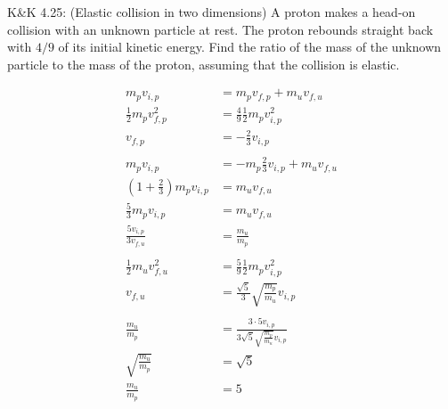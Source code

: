 \documentclass{esg8012pset}
\begin{document}
\begin{problem}{K\&K 4.25: (Elastic collision in two dimensions)}
  A proton makes a head-on collision with an unknown particle at rest. The proton rebounds straight back with $4 / 9$ of its initial kinetic energy. Find the ratio of the mass of the unknown particle to the mass of the proton, assuming that the collision is elastic.
\end{problem}
\begin{solution}
  \begin{align*}
  m_p v_{i, p} & = m_p v_{f,p} + m_u v_{f, u} \\
  \frac{1}{2}m_p v_{f, p}^2 & = \frac{4}{9} \frac{1}{2}m_p v_{i, p}^2 \\
  v_{f, p} & = -\frac{2}{3}v_{i, p} \\
  \\
  m_p v_{i, p} & = -m_p \frac{2}{3}v_{i, p} + m_u v_{f, u} \\
  \left(1 + \frac{2}{3}\right)m_p v_{i, p} & = m_u v_{f, u} \\
  \frac{5}{3}m_p v_{i, p} & = m_u v_{f, u} \\
  \frac{5v_{i, p}}{3v_{f, u}} & = \frac{m_u}{m_p} \\
  \\
  \frac{1}{2}m_u v_{f, u}^2 & = \frac{5}{9}\frac{1}{2}m_p v_{i, p}^2 \\
  v_{f, u} & = \frac{\sqrt{5}}{3}\sqrt{\frac{m_p}{m_u}} v_{i, p} \\
  \\
  \frac{m_u}{m_p} & = \frac{3\cdot 5 v_{i, p}}{3\sqrt{5}\sqrt{\frac{m_p}{m_u}} v_{i, p}}  \\
  \sqrt{\frac{m_u}{m_p}} & = \sqrt{5}  \\
  \frac{m_u}{m_p} & = 5
  \end{align*}
\end{solution}
\end{document}
